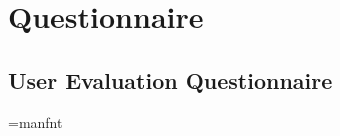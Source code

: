 \chapter{Questionnaire}

\section{User Evaluation Questionnaire}

\ifx\pdfoutput\undefined
\else
    \pdfpagewidth=210mm
    \pdfpageheight=297mm
\fi

\newif\ifbanner\bannerfalse
\bannerfalse
\advance\oddsidemargin-5mm
\advance\textwidth1cm

\font\manual=manfnt
\def\shared{\noindent\llap{\manual\char'170\kern.15em}}

\def\heading#1{
    \ifhmode\par\fi
    \removelastskip
    \vskip1ex plus 0.5ex minus 0.3 ex%
    \noindent
    \hbox to \hsize{ #1\hfill}
    \smallskip\par\nobreak}


\def\nicefrac#1/#2{\leavevmode%
    \raise.5ex\hbox{\the\scriptfont0 #1}%
    \kern-.1em/\kern-.15em%
    \lower.25ex\hbox{\the\scriptfont0 #2}}

\newdimen\scalewidth
{}\hsize 

\def\xboxit#1{\hbox{\lower0.7ex\vbox{\hrule\hbox{\vrule\kern1pt
    \vbox{\kern1pt\hbox{\strut\small #1}\kern1pt}\kern1pt\vrule}\hrule}}}

\def\boxit#1{\hbox{\lower0.7ex\vbox{\hrule\hbox{\vrule\kern1pt
    \vbox{\kern1pt\hbox to 1.4em
    {\small\strut\hfil #1\hfil}\kern1pt}\kern1pt\vrule}\hrule}}}

\def\sboxit{\hbox{\lower0.7ex\vbox{\hrule\hbox{\vrule\kern1pt
    \vbox{\kern1pt\hbox to 1ex
    {\small\strut\hfil}\kern1pt}\kern1pt\vrule}\hrule}}}


\def\fiveboxes#1#2#3#4#5{\hbox to\scalewidth
    {\boxit{#1}\hfil\boxit{#2}\hfil\boxit{#3}\hfil%
     \boxit{#4}\hfil\boxit{#5}}}
\def\manyboxes{\hbox to \scalewidth
    {\sboxit\hfil\sboxit\hfil\sboxit\hfil\sboxit\hfil\sboxit\hfil%
    \sboxit\hfil\sboxit\hfil\sboxit\hfil\sboxit\hfil\sboxit\hfil\sboxit}}


\def\boxes{\fiveboxes{}{}{}{}{}\ignorespaces}

\def\void{\boxit{}}

\def\xscale#1#2{%
    \setbox0=\hbox{\boxes}%
    \setbox1=\hbox to \wd0{\small\strut\hfill #2 $\to$}%
    \setbox2=\hbox to \wd0{\small\strut $\gets$ #1 \hfill}%
    \vbox{\vbox to 0pt{\vss\box1\box2\kern2pt}\vbox{\box0}}}

